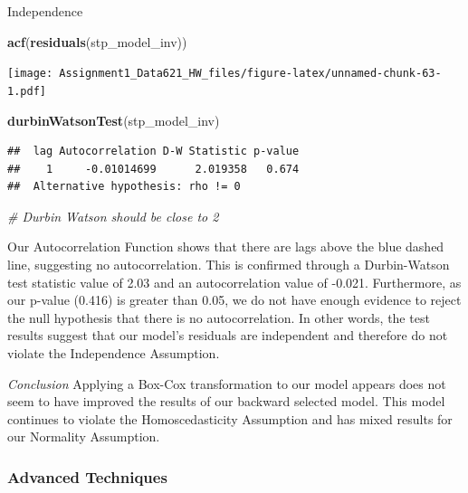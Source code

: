 \documentclass[
]{article}
\newenvironment{Shaded}{\begin{snugshade}}{\end{snugshade}}
\newcommand{\CommentTok}[1]{\textcolor[rgb]{0.56,0.35,0.01}{\textit{#1}}}
\newcommand{\FunctionTok}[1]{\textcolor[rgb]{0.13,0.29,0.53}{\textbf{#1}}}
\newcommand{\NormalTok}[1]{#1}
\begin{document}
Independence

\begin{Shaded}
\begin{Highlighting}[]
\FunctionTok{acf}\NormalTok{(}\FunctionTok{residuals}\NormalTok{(stp\_model\_inv))}
\end{Highlighting}
\end{Shaded}

\texttt{[image: Assignment1\_Data621\_HW\_files/figure-latex/unnamed-chunk-63-1.pdf]}

\begin{Shaded}
\begin{Highlighting}[]
\FunctionTok{durbinWatsonTest}\NormalTok{(stp\_model\_inv)}
\end{Highlighting}
\end{Shaded}

\begin{verbatim}
##  lag Autocorrelation D-W Statistic p-value
##    1     -0.01014699      2.019358   0.674
##  Alternative hypothesis: rho != 0
\end{verbatim}

\begin{Shaded}
\begin{Highlighting}[]
\CommentTok{\# Durbin Watson should be close to 2}
\end{Highlighting}
\end{Shaded}

Our Autocorrelation Function shows that there are lags above the blue
dashed line, suggesting no autocorrelation. This is confirmed through a
Durbin-Watson test statistic value of 2.03 and an autocorrelation value
of -0.021. Furthermore, as our p-value (0.416) is greater than 0.05, we
do not have enough evidence to reject the null hypothesis that there is
no autocorrelation. In other words, the test results suggest that our
model's residuals are independent and therefore do not violate the
Independence Assumption.

\emph{Conclusion} Applying a Box-Cox transformation to our model appears
does not seem to have improved the results of our backward selected
model. This model continues to violate the Homoscedasticity Assumption
and has mixed results for our Normality Assumption.

\subsubsection{Advanced Techniques}\label{advanced-techniques}
\end{document}
